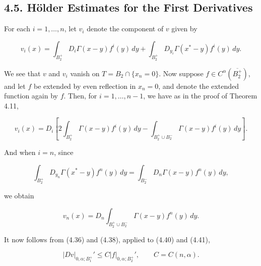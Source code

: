 \begin{theorem}

\subsection*{4.5. Hölder Estimates for the First Derivatives}

For each $i = 1,\ldots,n$, let $v_i$ denote the component of $v$ given by

\[
v_i(x)=\int_{B_2^+} D_i\Gamma(x-y)f^i(y)\,dy+\int_{B_2^+} D_{y_i}\Gamma(x^*-y)f^i(y)\,dy.
\]

We see that $v$ and $v_i$ vanish on $T=B_2\cap\{x_n=0\}$. Now suppose $f\in C^\alpha(\overline{B_2^+})$, and let $f$ be extended by even reflection in $x_n=0$, and denote the extended function again by $f$. Then, for $i=1,\ldots,n-1$, we have as in the proof of Theorem 4.11,

\begin{equation}
\tag{4.40}
v_i(x)=D_i\left[2\int_{B_2^+}\Gamma(x-y)f^i(y)\,dy-\int_{B_2^+\cup B_2^-}\Gamma(x-y)f^i(y)\,dy\right].
\end{equation}

And when $i=n$, since

\[
\int_{B_2^+} D_{y_n}\Gamma(x^*-y)f^n(y)\,dy=\int_{B_2^-} D_n\Gamma(x-y)f^n(y)\,dy,
\]

we obtain

\begin{equation}
\tag{4.41}
v_n(x)=D_n\int_{B_2^+\cup B_2^-}\Gamma(x-y)f^n(y)\,dy.
\end{equation}

It now follows from (4.36) and (4.38), applied to (4.40) and (4.41),

\begin{equation}
\tag{4.42}
|Dv|_{0,\alpha;B_1^+}'\le C|f|_{0,\alpha;B_2^+}', \qquad C=C(n,\alpha).
\end{equation}

\end{theorem}

